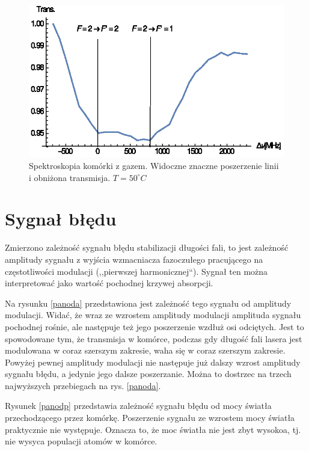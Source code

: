 \documentclass[a4paper,10pt]{article}
\begin{document}
\begin{figure}[h!]
\centering
 \includegraphics[width=\textwidth]{spek_gaz.eps}
 \caption{Spektroskopia komórki z gazem. Widoczne znaczne poszerzenie linii i obniżona transmisja. $T=50^{\circ}C$}
 \label{fig:spekgaz}
\end{figure}


\section{Sygnał błędu}

Zmierzono zależność sygnału błędu stabilizacji długości fali, to jest zależność amplitudy sygnału z wyjścia wzmacniacza fazoczułego pracującego na częstotliwości modulacji (,,pierwszej harmonicznej``). Sygnał ten można interpretować jako wartość pochodnej krzywej absorpcji.

Na rysunku \ref{panoda} przedstawiona jest zależność tego sygnału od amplitudy modulacji. Widać, że wraz ze wzrostem amplitudy modulacji amplituda sygnału pochodnej rośnie, ale następuje też jego poszerzenie wzdłuż osi odciętych. Jest to spowodowane tym, że transmisja w komórce, podczas gdy długość fali lasera jest modulowana w coraz szerszym zakresie, waha się w coraz szerszym zakresie. Powyżej pewnej amplitudy modulacji nie następuje już dalszy wzrost amplitudy sygnału błędu, a jedynie jego dalsze poszerzanie. Można to dostrzec na trzech najwyższych przebiegach na rys. \ref{panoda}.

Rysunek \ref{panodp} przedstawia zależność sygnału błędu od mocy światła przechodzącego przez komórkę. Poszerzenie sygnału ze wzrostem mocy światła praktycznie nie występuje. Oznacza to, że moc światła nie jest zbyt wysokoa, tj. nie wysyca populacji atomów w komórce.
\end{document}
